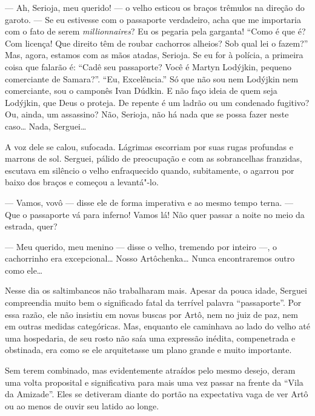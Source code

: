 
--- Ah, Serioja, meu querido! --- o velho esticou os braços trêmulos na
direção do garoto. --- Se eu estivesse com o passaporte verdadeiro, acha
que me importaria com o fato de serem \emph{millionnaires}? Eu os pegaria
pela garganta! ``Como é que é? Com licença! Que direito têm de roubar
cachorros alheios? Sob qual lei o fazem?'' Mas, agora, estamos com as
mãos atadas, Serioja. Se eu for à polícia, a primeira coisa que falarão
é: ``Cadê seu passaporte? Você é Martyn Lodýjkin, pequeno comerciante de
Samara?''. ``Eu, Excelência.'' Só que não sou nem Lodýjkin nem
comerciante, sou o camponês Ivan Dúdkin. E não faço ideia de quem seja
Lodýjkin, que Deus o proteja. De repente é um ladrão ou um condenado
fugitivo? Ou, ainda, um assassino? Não, Serioja, não há nada que se
possa fazer neste caso\ldots{} Nada, Serguei\ldots{}

A voz dele se calou, sufocada. Lágrimas escorriam por suas rugas
profundas e marrons de sol. Serguei, pálido de preocupação e com as
sobrancelhas franzidas, escutava em silêncio o velho enfraquecido
quando, subitamente, o agarrou por baixo dos braços e começou a
levantá"-lo.

--- Vamos, vovô --- disse ele de forma imperativa e ao mesmo tempo
terna. --- Que o passaporte vá para inferno! Vamos lá! Não quer passar a
noite no meio da estrada, quer?

--- Meu querido, meu menino --- disse o velho, tremendo por inteiro ---,
o cachorrinho era excepcional\ldots{} Nosso Artôchenka\ldots{} Nunca encontraremos
outro como ele\ldots{}


Nesse dia os saltimbancos não trabalharam mais. Apesar da pouca idade,
Serguei compreendia muito bem o significado fatal da terrível palavra
``passaporte''. Por essa razão, ele não insistiu em novas buscas por
Artô, nem no juiz de paz, nem em outras medidas categóricas. Mas,
enquanto ele caminhava ao lado do velho até uma hospedaria, de seu rosto
não saía uma expressão inédita, compenetrada e obstinada, era como se
ele arquitetasse um plano grande e muito importante.

Sem terem combinado, mas evidentemente atraídos pelo mesmo desejo, deram
uma volta proposital e significativa para mais uma vez passar na frente
da ``Vila da Amizade''. Eles se detiveram diante do portão na
expectativa vaga de ver Artô ou ao menos de ouvir seu latido ao longe.

